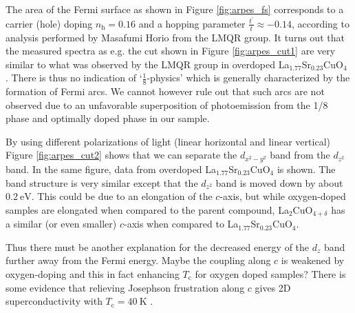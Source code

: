 The area of the Fermi surface as shown in Figure \ref{fig:arpes_fs} corresponds to a carrier (hole) doping $n_\text{h} = 0.16$ and a hopping parameter $\frac{t^\prime}{t} \approx -0.14$, according to analysis performed by Masafumi Horio from the LMQR group.
It turns out that the measured spectra as e.g. the cut shown in Figure \ref{fig:arpes_cut1} are very similar to what was observed by the LMQR group in overdoped La$_{1.77}$Sr$_{0.23}$CuO$_4$ \cite{Horio2018}. There is thus no indication of `$\frac{1}{8}$-physics' which is generally characterized by the formation of Fermi arcs. We cannot however rule out that such arcs are not observed due to an unfavorable superposition of photoemission from the 1/8 phase and optimally doped phase in our sample.  

By using different polarizations of light (linear horizontal and linear vertical) Figure \ref{fig:arpes_cut2} shows that we can separate the $d_{x^2-y^2}$ band from the $d_{z^2}$ band. In the same figure, data from overdoped La$_{1.77}$Sr$_{0.23}$CuO$_4$ \cite{Horio2018} is shown. The band structure is very similar except that the $d_{z^2}$ band is moved down by about $\SI{0.2}{\eV}$. This could be due to an elongation of the $c$-axis, but while oxygen-doped samples are elongated when compared to the parent compound, La$_2$CuO$_{4+\delta}$ has a similar (or even smaller) $c$-axis when compared to La$_{1.77}$Sr$_{0.23}$CuO$_4$.

Thus there must be another explanation for the decreased energy of the $d_z$ band further away from the Fermi energy. Maybe the coupling along $c$ is weakened by oxygen-doping and this in fact enhancing $T_\text{c}$ for oxygen doped samples? There is some evidence that relieving Josephson frustration along $c$ gives 2D superconductivity with $T_\text{c} = \SI{40}{\kelvin}$ \cite{Li2007}.
